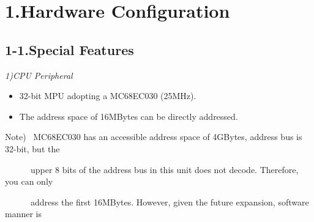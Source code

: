 ﻿\documentclass[twoside,a4paper,12pt]{article}
\begin{document}

\newpage

\cfoot{\ \\[-15mm]
- \thepage \ -}

\section*{1.Hardware Configuration}

\subsection*{1-1.Special Features}

\renewcommand{\labelitemi}{・}
\setlength{\parindent}{20mm}
\setlength{\parskip}{0mm}
\small
\itshape
1)CPU Peripheral
\begin{itemize}[leftmargin=30mm, itemsep=-1mm, topsep=1mm]
\item
32-bit MPU adopting a MC68EC030 (25MHz).
\item
The address space of 16MBytes can be directly addressed.
\end{itemize}

Note) \ MC68EC030 has an accessible address space of 4GBytes, address bus is 32-bit, but the 

\ \ \ \ \ \ upper 8 bits of the address bus in this unit does not decode. Therefore, you can only

\ \ \ \ \ \ address the first 16MBytes. However, given the future expansion, software manner is
\end{document}
